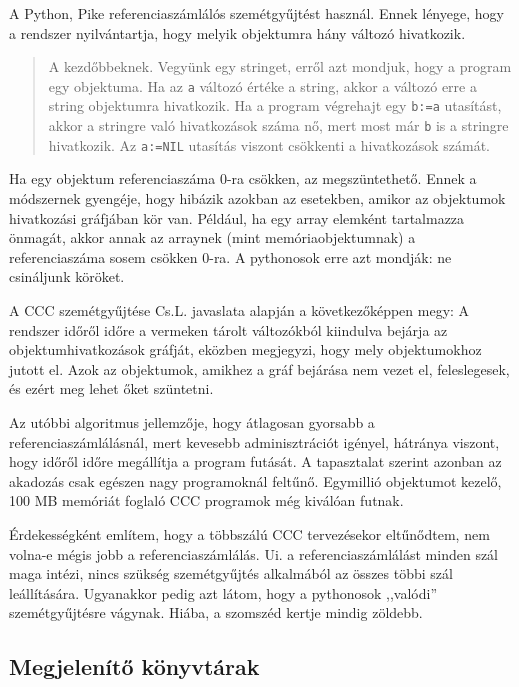 A  Python, Pike referenciaszámlálós szemétgyűjtést használ.
Ennek lényege, hogy a rendszer nyilvántartja, hogy melyik objektumra
hány változó hivatkozik.
\begin{quote}
  A kezdőbbeknek. Vegyünk egy stringet, erről azt mondjuk,
  hogy a program egy objektuma. Ha az \verb!a! változó értéke a string, 
  akkor a változó erre a string objektumra hivatkozik.
  Ha a program végrehajt egy \verb!b:=a! utasítást, akkor a
  stringre való hivatkozások száma nő, mert most már \verb!b! is
  a stringre hivatkozik. Az \verb!a:=NIL! utasítás viszont
  csökkenti a hivatkozások számát.
\end{quote}
Ha egy objektum referenciaszáma 0-ra csökken, az megszüntethető.
Ennek a módszernek gyengéje, hogy hibázik azokban az esetekben,
amikor az objektumok hivatkozási gráfjában kör van.
Például, ha egy array elemként tartalmazza önmagát, 
akkor annak az arraynek (mint memóriaobjektumnak) a referenciaszáma
sosem csökken 0-ra. A pythonosok erre azt mondják: ne csináljunk köröket.

A CCC szemétgyűjtése Cs.L. javaslata alapján a következőképpen megy:
A rendszer időről időre a vermeken tárolt változókból kiindulva
bejárja az objektumhivatkozások gráfját, eközben megjegyzi, hogy
mely  objektumokhoz jutott el. Azok az objektumok,
amikhez a gráf bejárása nem vezet el, feleslegesek, és ezért
meg lehet őket szüntetni. 

Az utóbbi algoritmus jellemzője, hogy átlagosan gyorsabb
a referenciaszámlálásnál, mert kevesebb adminisztrációt igényel,
hátránya viszont, hogy időről időre megállítja a program futását.
A tapasztalat szerint azonban az akadozás csak egészen 
nagy programoknál feltűnő. Egymillió objektumot kezelő,
100 MB memóriát foglaló CCC programok még kiválóan futnak.

Érdekességként említem, hogy a többszálú CCC tervezésekor 
eltűnődtem, nem volna-e mégis jobb a referenciaszámlálás.
Ui. a referenciaszámlálást minden szál maga intézi, 
nincs szükség szemétgyűjtés alkalmából az összes többi szál 
leállítására. Ugyanakkor pedig azt látom, hogy a pythonosok 
,,valódi'' szemétgyűjtésre vágynak. Hiába, a szomszéd kertje mindig
zöldebb.

\subsection{Megjelenítő könyvtárak}

